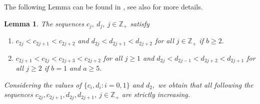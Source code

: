 \documentclass[12pt,reqno]{amsart}
\theoremstyle{plain}
\newtheorem{lem}{Lemma}
\theoremstyle{definition}
\theoremstyle{remark}
\newcommand\bz{\mathbb Z}
\begin{document}
The following Lemma can be found in \cite{anderson10KacMoody, carbone2015root}, see also \cite[Lemma 3.1,3.5]{carbone2021commutator} for more details.
\begin{lem}\label{increasing}
     The sequences $c_j,\ d_j,\ j\in\bz_+$ satisfy
     \begin{enumerate}
         \item $c_{2j}<c_{2j+1}<c_{2j+2}$ and $d_{2j}<d_{2j+1}<d_{2j+2}$ for all $j\in\bz_+$ if $b\geq 2.$
         \item $c_{2j+1}<c_{2j}<c_{2j+3}<c_{2j+2}$ for all $j\geq 1$ and $d_{2j}<d_{2j-1}<d_{2j+2}<d_{2j+1}$ for all $j\geq 2$ if $b=1$ and $a\geq 5.$
     \end{enumerate}
     Considering the values of $\{c_i,d_i:i=0,1\}$ and $d_2,$ we obtain that all following the sequences $c_{2j},c_{2j+1},d_{2j},d_{2j+1},\ j\in\bz_+$ are strictly increasing.
\end{lem}
\end{document}
